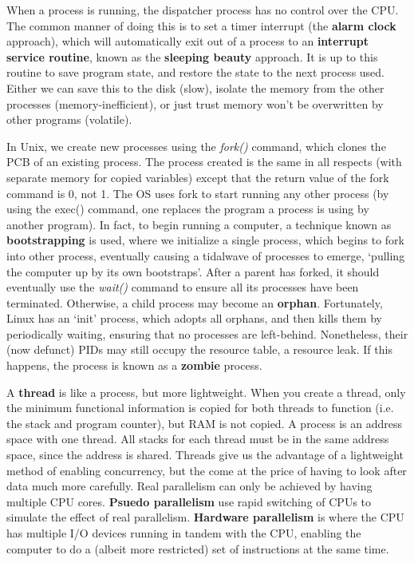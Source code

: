 When a process is running, the dispatcher process has no control over the CPU. The common manner of doing this is to set a timer interrupt (the {\bf alarm clock} approach), which will automatically exit out of a process to an {\bf interrupt service routine}, known as the {\bf sleeping beauty} approach. It is up to this routine to save program state, and restore the state to the next process used. Either we can save this to the disk (slow), isolate the memory from the other processes (memory-inefficient), or just trust memory won't be overwritten by other programs (volatile).

In Unix, we create new processes using the {\it fork()} command, which clones the PCB of an existing process. The process created is the same in all respects (with separate memory for copied variables) except that the return value of the fork command is 0, not 1. The OS uses fork to start running any other process (by using the exec() command, one replaces the program a process is using by another program). In fact, to begin running a computer, a technique known as {\bf bootstrapping} is used, where we initialize a single process, which begins to fork into other process, eventually causing a tidalwave of processes to emerge, `pulling the computer up by its own bootstraps'. After a parent has forked, it should eventually use the {\it wait()} command to ensure all its processes have been terminated. Otherwise, a child process may become an {\bf orphan}. Fortunately, Linux has an `init' process, which adopts all orphans, and then kills them by periodically waiting, ensuring that no processes are left-behind. Nonetheless, their (now defunct) PIDs may still occupy the resource table, a resource leak. If this happens, the process is known as a {\bf zombie} process.

A {\bf thread} is like a process, but more lightweight. When you create a thread, only the minimum functional information is copied for both threads to function (i.e. the stack and program counter), but RAM is not copied. A process is an address space with one thread. All stacks for each thread must be in the same address space, since the address is shared. Threads give us the advantage of a lightweight method of enabling concurrency, but the come at the price of having to look after data much more carefully. Real parallelism can only be achieved by having multiple CPU cores. {\bf Psuedo parallelism} use rapid switching of CPUs to simulate the effect of real parallelism. {\bf Hardware parallelism} is where the CPU has multiple I/O devices running in tandem with the CPU, enabling the computer to do a (albeit more restricted) set of instructions at the same time.

